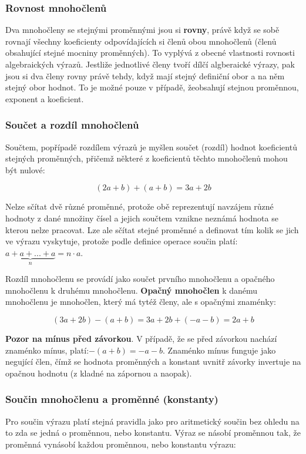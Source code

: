 \documentclass[11pt]{article}
\begin{document}
\subsubsection{Rovnost mnohočlenů}
Dva mnohočleny se stejnými proměnnými jsou si {\bf rovny}, právě když se sobě rovnají všechny koeficienty odpovídajících si členů obou mnohočlenů (členů obsahující stejné mocniny proměnných). To vyplývá z obecné vlastnosti rovnosti algebraických výrazů. Jestliže jednotlivé členy tvoří dílčí algberaické výrazy, pak jsou si dva členy rovny právě tehdy, když mají stejný definiční obor a na něm stejný obor hodnot. To je možné pouze v případě, žeobsahují stejnou proměnnou, exponent a koeficient. 


\subsubsection{Součet a rozdíl mnohočlenů}

Součtem, popřípadě rozdílem výrazů je myšlen součet (rozdíl) hodnot koeficientů stejných proměnných, přičemž některé z koeficientů těchto mnohočlenů mohou být nulové:

$$ (2a+b) + (a+b) = 3a + 2b $$

Nelze sčítat dvě různé proměnné, protože obě reprezentují navzájem různé hodnoty z dané množiny čísel a jejich součtem vznikne neznámá hodnota se kterou nelze pracovat. Lze ale sčítat stejné proměnné a definovat tím kolik se jich ve výrazu vyskytuje, protože podle definice operace součin platí: $\underbrace{a+a+...+a}_n = n\cdot a$.

Rozdíl mnohočlenu se provádí jako součet prvního mnohočlenu a opačného mnohočlenu k druhému mnohočlenu. {\bf Opačný mnohočlen} k danému mnohočlenu je mnohočlen, který má tytéž členy, ale s opačnými znaménky:

$$ (3a+2b) - (a+b) = 3a + 2b + (-a -b) =  2a + b $$

{\bf Pozor na mínus před závorkou}. V případě, že se před závorkou nachází znaménko mínus, platí:$-(a+b)=-a-b$. Znaménko mínus funguje jako negující člen, čímž se hodnota proměnných a konstant uvnitř závorky invertuje na opačnou hodnotu (z kladné na zápornou a naopak).

\subsubsection{Součin mnohočlenu a proměnné (konstanty)}

Pro součin výrazu platí stejná pravidla jako pro aritmetický součin bez ohledu na to zda se jedná o proměnnou, nebo konstantu. Výraz se násobí proměnnou tak, že proměnná vynásobí každou proměnnou, nebo konstantu výrazu:
\end{document}
